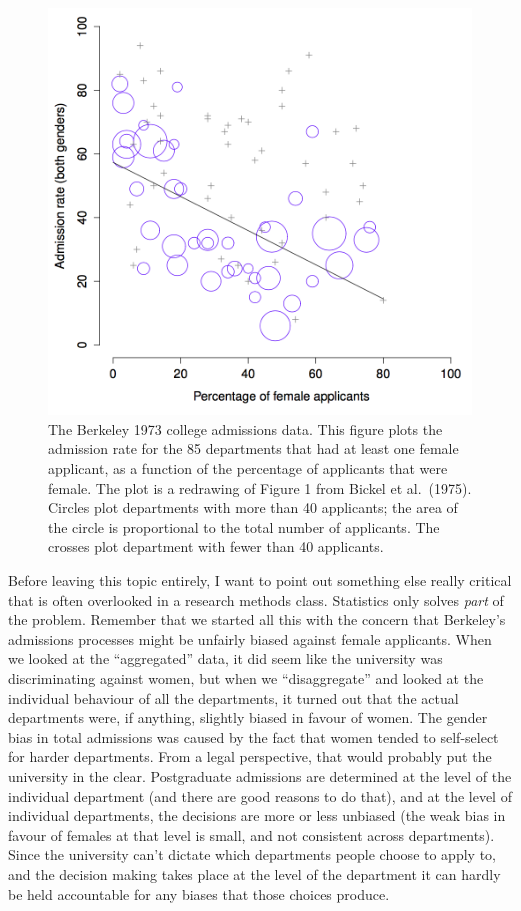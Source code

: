 \documentclass[
]{book}
\begin{document}
\begin{figure}
\centering
\includegraphics{figures/1Simpson.png}
\caption{\label{fig:1simpson}The Berkeley 1973 college admissions data. This figure plots the admission rate for the 85 departments that had at least one female applicant, as a function of the percentage of applicants that were female. The plot is a redrawing of Figure 1 from Bickel et al.~(1975). Circles plot departments with more than 40 applicants; the area of the circle is proportional to the total number of applicants. The crosses plot department with fewer than 40 applicants.}
\end{figure}

Before leaving this topic entirely, I want to point out something else really critical that is often overlooked in a research methods class. Statistics only solves \emph{part} of the problem. Remember that we started all this with the concern that Berkeley's admissions processes might be unfairly biased against female applicants. When we looked at the ``aggregated'' data, it did seem like the university was discriminating against women, but when we ``disaggregate'' and looked at the individual behaviour of all the departments, it turned out that the actual departments were, if anything, slightly biased in favour of women. The gender bias in total admissions was caused by the fact that women tended to self-select for harder departments. From a legal perspective, that would probably put the university in the clear. Postgraduate admissions are determined at the level of the individual department (and there are good reasons to do that), and at the level of individual departments, the decisions are more or less unbiased (the weak bias in favour of females at that level is small, and not consistent across departments). Since the university can't dictate which departments people choose to apply to, and the decision making takes place at the level of the department it can hardly be held accountable for any biases that those choices produce.
\end{document}
